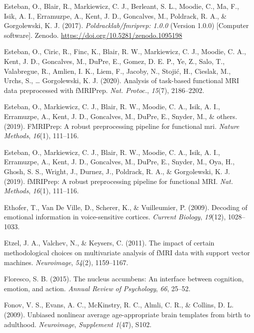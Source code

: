 \documentclass[12pt,american,a4paper,oneside,]{memoir} %
\begin{document}
\leavevmode\hypertarget{ref-esteban_oscar_2017_1095198}{}%
Esteban, O., Blair, R., Markiewicz, C. J., Berleant, S. L., Moodie, C., Ma, F., Isik, A. I., Erramuzpe, A., Kent, J. D., Goncalves, M., Poldrack, R. A., \& Gorgolewski, K. J. (2017). \emph{Poldracklab/fmriprep: 1.0.0} (Version 1.0.0) {[}Computer software{]}. Zenodo. \url{https://doi.org/10.5281/zenodo.1095198}

\leavevmode\hypertarget{ref-Esteban2020-qw}{}%
Esteban, O., Ciric, R., Finc, K., Blair, R. W., Markiewicz, C. J., Moodie, C. A., Kent, J. D., Goncalves, M., DuPre, E., Gomez, D. E. P., Ye, Z., Salo, T., Valabregue, R., Amlien, I. K., Liem, F., Jacoby, N., Stojić, H., Cieslak, M., Urchs, S., \ldots{} Gorgolewski, K. J. (2020). Analysis of task-based functional MRI data preprocessed with fMRIPrep. \emph{Nat. Protoc.}, \emph{15}(7), 2186--2202.

\leavevmode\hypertarget{ref-esteban2019fmriprep}{}%
Esteban, O., Markiewicz, C. J., Blair, R. W., Moodie, C. A., Isik, A. I., Erramuzpe, A., Kent, J. D., Goncalves, M., DuPre, E., Snyder, M., \& others. (2019). FMRIPrep: A robust preprocessing pipeline for functional mri. \emph{Nature Methods}, \emph{16}(1), 111--116.

\leavevmode\hypertarget{ref-Esteban2019-ri}{}%
Esteban, O., Markiewicz, C. J., Blair, R. W., Moodie, C. A., Isik, A. I., Erramuzpe, A., Kent, J. D., Goncalves, M., DuPre, E., Snyder, M., Oya, H., Ghosh, S. S., Wright, J., Durnez, J., Poldrack, R. A., \& Gorgolewski, K. J. (2019). fMRIPrep: A robust preprocessing pipeline for functional MRI. \emph{Nat. Methods}, \emph{16}(1), 111--116.

\leavevmode\hypertarget{ref-ethofer2009decoding}{}%
Ethofer, T., Van De Ville, D., Scherer, K., \& Vuilleumier, P. (2009). Decoding of emotional information in voice-sensitive cortices. \emph{Current Biology}, \emph{19}(12), 1028--1033.

\leavevmode\hypertarget{ref-etzel2011impact}{}%
Etzel, J. A., Valchev, N., \& Keysers, C. (2011). The impact of certain methodological choices on multivariate analysis of fMRI data with support vector machines. \emph{Neuroimage}, \emph{54}(2), 1159--1167.

\leavevmode\hypertarget{ref-floresco2015nucleus}{}%
Floresco, S. B. (2015). The nucleus accumbens: An interface between cognition, emotion, and action. \emph{Annual Review of Psychology}, \emph{66}, 25--52.

\leavevmode\hypertarget{ref-Fonov2009-sr}{}%
Fonov, V. S., Evans, A. C., McKinstry, R. C., Almli, C. R., \& Collins, D. L. (2009). Unbiased nonlinear average age-appropriate brain templates from birth to adulthood. \emph{Neuroimage}, \emph{Supplement 1}(47), S102.
\end{document}
